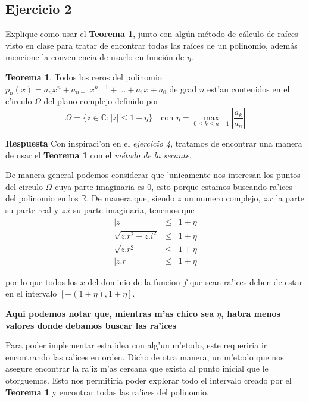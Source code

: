\documentclass[11pt]{article}
\begin{document}
\newpage
    \hypertarget{ejercicio-2}{%
\subsection{Ejercicio 2}\label{ejercicio-2}}

		Explique como usar el \textbf{Teorema 1}, junto con alg\'un m\'etodo de
	c\'alculo de ra\'ices visto en clase para tratar de encontrar todas las
	ra\'ices de un polinomio, adem\'as mencione la conveniencia de usarlo en
	funci\'on de \(\eta\).

	\textbf{Teorema 1}. Todos los ceros del polinomio
	\(p_n(x) = a_{n}x^{n} + a_{n-1}x^{n-1} +\dots+ a_1x + a_0\) de grad
	\(n\) est'an contenidos en el c'irculo \(\Omega\) del plano complejo
	definido por
	\begin{equation*} \Omega =\{ z\in\mathbb C: |z| \leq 1 + \eta \} \quad\text{con }\eta = \max_{0\leq k\leq n-1}\left| \frac{a_k}{a_n}\right| 
	\end{equation*}

		\textbf{Respuesta} Con inspiraci'on en el \textit{ejercicio 4}, tratamos
	de encontrar una manera de usar el \textbf{Teorema 1} con el
	\textit{m\'etodo de la secante}.

	De manera general podemos considerar que 'unicamente nos interesan los
	puntos del circulo \(\Omega\) cuya parte imaginaria es \(0\), esto
	porque estamos buscando ra'ices del polinomio en los \(\mathbb R\). De
	manera que, siendo \(z\) un numero complejo, \(z.r\) la parte su parte
	real y \(z.i\) su parte imaginaria, tenemos que \begin{eqnarray*}
		|z| &\leq& 1+ \eta \\
		\sqrt{z.r^2 + z.i^2} &\leq& 1+ \eta \\
		\sqrt{z.r^2} &\leq& 1+\eta \\
		|z.r| &\leq& 1+\eta
	\end{eqnarray*}

	por lo que todos los \(x\) del dominio de la funcion \(f\) que sean
	ra'ices deben de estar en el intervalo \([-(1+\eta), 1+\eta]\).

	\textbf{Aqui podemos notar que, mientras m'as chico sea \(\eta\), habra
	menos valores donde debamos buscar las ra'ices}

	Para poder implementar esta idea con alg'un m'etodo, este requeriria ir
	encontrando las ra'ices en orden. Dicho de otra manera, un m'etodo que
	nos asegure encontrar la ra'iz m'as cercana que exista al punto inicial
	que le otorguemos. Esto nos permitiria poder explorar todo el intervalo
	creado por el \textbf{Teorema 1} y encontrar todas las ra'ices del
	polinomio.
\end{document}
